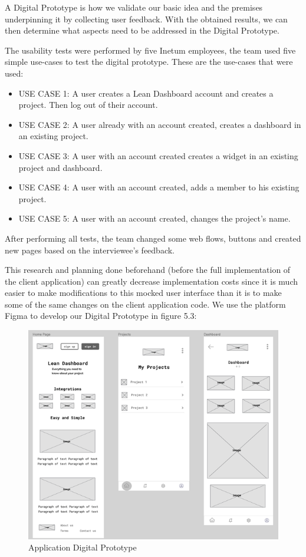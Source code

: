 \documentclass[a4paper,twoside,10pt]{report}
\begin{document}
A Digital Prototype is how we validate our basic idea and the premises underpinning it by collecting user feedback.
With the obtained results, we can then determine what aspects need to be addressed in the Digital Prototype.

The usability tests were performed by five Inetum employees, the team used five simple use-cases to test the digital prototype. These are the use-cases that were used: 
 \begin{itemize}
	\item USE CASE 1: A user creates a Lean Dashboard account and creates a project. Then log out of their account.
	\item USE CASE 2: A user already with an account created, creates a dashboard in an existing project.
	\item USE CASE 3: A user with an account created creates a widget in an existing project and dashboard.
	\item USE CASE 4: A user with an account created, adds a member to his existing project.
	\item USE CASE 5: A user with an account created, changes the project's name.
\end{itemize}	

After performing all tests, the team changed some web flows, buttons and created new pages based on the interviewee's feedback. 

This research and planning done beforehand (before the full implementation of the client application) can greatly decrease implementation costs since it is much easier to make modifications to this mocked user interface than it is to make some of the same changes on the client application code.
We use the platform Figma\cite{FIGMA} to develop our Digital Prototype in figure 5.3:
 
\begin{figure}[h!]
\center
  \includegraphics[width=\textwidth]{digital-prototype.png}
\caption{Application Digital Prototype}
\end{figure}
\end{document}
